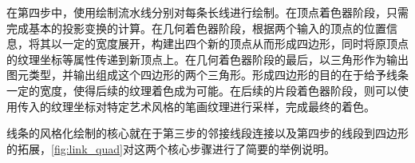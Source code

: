 在第四步中，使用绘制流水线分别对每条长线进行绘制。在顶点着色器阶段，只需完成基本的投影变换的计算。在几何着色器阶段，根据两个输入的顶点的位置信息，将其以一定的宽度展开，构建出四个新的顶点从而形成四边形，同时将原顶点的纹理坐标等属性传递到新顶点上。在几何着色器阶段的最后，以三角形作为输出图元类型，并输出组成这个四边形的两个三角形。形成四边形的目的在于给予线条一定的宽度，使得后续的纹理着色成为可能。在后续的片段着色器阶段，则可以使用传入的纹理坐标对特定艺术风格的笔画纹理进行采样，完成最终的着色。

线条的风格化绘制的核心就在于第三步的邻接线段连接以及第四步的线段到四边形的拓展，\autoref{fig:link_quad}对这两个核心步骤进行了简要的举例说明。
